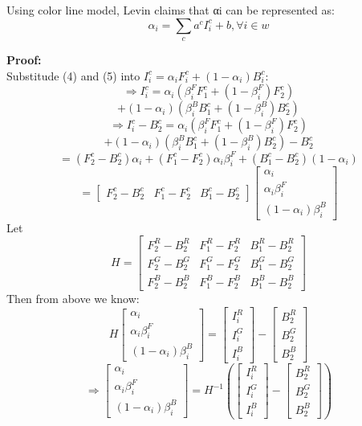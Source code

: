 \documentclass[11pt,letterpaper]{article}
\begin{document}
Using color line model, Levin claims that αi can be represented as:
$$\alpha_i = \sum_{c}a^cI_i^c + b, \forall i \in w$$

\textbf{Proof:} \\
Substitude (4) and (5) into $I_i^c = \alpha_i F_i^c + (1-\alpha_i)B_i^c$:
$$\Rightarrow I_i^c = \alpha_i (\beta^F_{i} F_1^c + (1-\beta^F_{i})F_2^c)$$
$$ + (1-\alpha_i)(\beta^B_{i} B_1^c + (1-\beta^B_{i})B_2^c)$$
$$\Rightarrow I_i^c - B_2^c = \alpha_i (\beta^F_{i} F_1^c + (1-\beta^F_{i})F_2^c)$$
$$ + (1-\alpha_i)(\beta^B_{i} B_1^c + (1-\beta^B_{i})B_2^c) - B_2^c$$
$$ = (F_2^c - B_2^c)\alpha_i + (F_1^c - F_2^c)\alpha_i \beta_i^F + (B_1^c - B_2^c)(1-\alpha_i)$$
$$ = \begin{bmatrix}
    F_2^c - B_2^c & F_1^c - F_2^c & B_1^c - B_2^c
  \end{bmatrix}
  \begin{bmatrix}
    \alpha_i \\ \alpha_i \beta_i^F \\ (1-\alpha_i)\beta_i^B
  \end{bmatrix} $$
Let $$H = \begin{bmatrix}
    F_2^R - B_2^R & F_1^R - F_2^R & B_1^R - B_2^R \\
    F_2^G - B_2^G & F_1^G - F_2^G & B_1^G - B_2^G \\
    F_2^B - B_2^B & F_1^B - F_2^B & B_1^B - B_2^B 
  \end{bmatrix}$$
Then from above we know:
$$H\begin{bmatrix}
    \alpha_i \\ \alpha_i \beta_i^F \\ (1-\alpha_i)\beta_i^B
  \end{bmatrix} = 
  \begin{bmatrix}
    I_i^R \\ I_i^G \\ I_i^B
  \end{bmatrix} - 
  \begin{bmatrix}
    B_2^R \\ B_2^G \\ B_2^B
  \end{bmatrix}$$
$$\Rightarrow \begin{bmatrix}
    \alpha_i \\ \alpha_i \beta_i^F \\ (1-\alpha_i)\beta_i^B
  \end{bmatrix} = H^{-1}(
  \begin{bmatrix}
    I_i^R \\ I_i^G \\ I_i^B
  \end{bmatrix} - 
  \begin{bmatrix}
    B_2^R \\ B_2^G \\ B_2^B
  \end{bmatrix})$$
\end{document}
